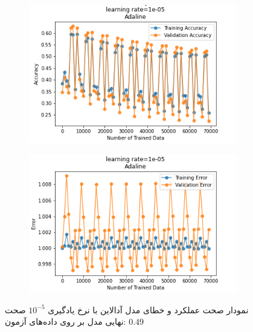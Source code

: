 \documentclass[12pt, a4paper]{article}
\begin{document}
\begin{figure}[h]
    \begin{subfigure}{0.45\linewidth}
        \centering
        \includegraphics[width=\linewidth]{images/5/adaline/lr/acc_1e-05.png}
    \end{subfigure}
    \hfil
    \begin{subfigure}{0.45\linewidth}
        \centering
        \includegraphics[width=\linewidth]{images/5/adaline/lr/error_1e-05.png}
    \end{subfigure}
    \caption{نمودار صحت عملکرد‌ و خطای مدل آدالاین با نرخ یادگیری $10^{-5}$
    \newline
    صحت نهایی مدل بر روی داده‌های آزمون: $0.49$}
\end{figure}
\end{document}
